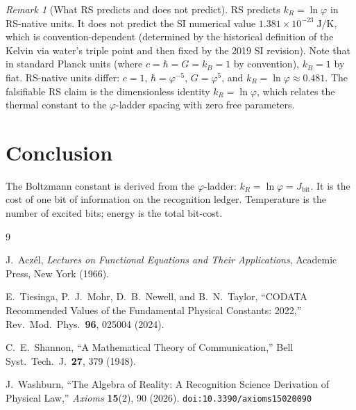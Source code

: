\documentclass[12pt,a4paper]{article}
\theoremstyle{definition}
\theoremstyle{remark}
\newtheorem{remark}[theorem]{Remark}
\begin{document}
\begin{remark}[What RS predicts and does not predict]
RS predicts $k_R = \ln\varphi$ in RS-native units.  It does not
predict the SI numerical value $1.381 \times 10^{-23}\;\mathrm{J/K}$,
which is convention-dependent (determined by the historical definition
of the Kelvin via water's triple point and then fixed by the 2019 SI
revision).  Note that in standard Planck units (where
$c = \hbar = G = k_B = 1$ by convention), $k_B = 1$ by fiat.
RS-native units differ: $c = 1$, $\hbar = \varphi^{-5}$,
$G = \varphi^5$, and $k_R = \ln\varphi \approx 0.481$.  The
falsifiable RS claim is the dimensionless identity
$k_R = \ln\varphi$, which relates the thermal constant to
the $\varphi$-ladder spacing with zero free parameters.
\end{remark}

\section{Conclusion}

The Boltzmann constant is derived from the $\varphi$-ladder: $k_R =
\ln\varphi = J_{\mathrm{bit}}$.  It is the cost of one bit of
information on the recognition ledger.  Temperature is the number of
excited bits; energy is the total bit-cost.

\begin{thebibliography}{9}

J.~Acz\'el, \emph{Lectures on Functional Equations and Their Applications},
Academic Press, New York (1966).

E.~Tiesinga, P.~J.~Mohr, D.~B.~Newell, and B.~N.~Taylor,
``CODATA Recommended Values of the Fundamental Physical
Constants: 2022,'' Rev.\ Mod.\ Phys.\ \textbf{96}, 025004 (2024).

C.~E.~Shannon, ``A Mathematical Theory of Communication,''
Bell Syst.\ Tech.\ J.\ \textbf{27}, 379 (1948).

J.~Washburn, ``The Algebra of Reality: A Recognition Science Derivation
of Physical Law,'' \emph{Axioms} \textbf{15}(2), 90 (2026).
\texttt{doi:10.3390/axioms15020090}

\end{thebibliography}
\end{document}
